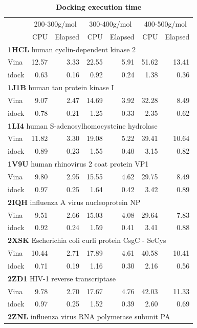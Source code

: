 \documentclass[10pt]{article}
\begin{document}
\begin{table}[!ht]
\caption{
\bf{Docking execution time}}
\begin{tabular}{lrrrrrr}
\hline
& \multicolumn{2}{c}{200-300g/mol} & \multicolumn{2}{c}{300-400g/mol} & \multicolumn{2}{c}{400-500g/mol}\\
& CPU & Elapsed & CPU & Elapsed & CPU & Elapsed\\
\hline
\multicolumn{7}{l}{\textbf{1HCL} human cyclin-dependent kinase 2}\\
Vina  & 12.57 &  3.33 & 22.55 &  5.91 & 51.62 & 13.41\\
idock &  0.63 &  0.16 &  0.92 &  0.24 &  1.38 &  0.36\\
\multicolumn{7}{l}{\textbf{1J1B} human tau protein kinase I}\\
Vina  &  9.07 &  2.47 & 14.69 &  3.92 & 32.28 &  8.49\\
idock &  0.78 &  0.21 &  1.25 &  0.33 &  2.35 &  0.62\\
\multicolumn{7}{l}{\textbf{1LI4} human S-adenosylhomocysteine hydrolase}\\
Vina  & 11.82 &  3.30 & 19.08 &  5.22 & 39.41 & 10.64\\
idock &  0.89 &  0.23 &  1.55 &  0.40 &  3.15 &  0.82\\
\multicolumn{7}{l}{\textbf{1V9U} human rhinovirus 2 coat protein VP1}\\
Vina  &  9.80 &  2.95 & 15.55 &  4.62 & 29.75 &  8.49\\
idock &  0.97 &  0.25 &  1.64 &  0.42 &  3.42 &  0.89\\
\multicolumn{7}{l}{\textbf{2IQH} influenza A virus nucleoprotein NP}\\
Vina  &  9.51 &  2.66 & 15.03 &  4.08 & 29.64 &  7.83\\
idock &  0.92 &  0.24 &  1.59 &  0.41 &  3.41 &  0.88\\
\multicolumn{7}{l}{\textbf{2XSK} Escherichia coli curli protein CsgC - SeCys}\\
Vina  & 10.44 &  2.71 & 17.89 &  4.61 & 40.58 & 10.41\\
idock &  0.71 &  0.19 &  1.16 &  0.30 &  2.16 &  0.56\\
\multicolumn{7}{l}{\textbf{2ZD1} HIV-1 reverse transcriptase}\\
Vina  &  9.78 &  2.70 & 17.67 &  4.76 & 42.03 & 11.33\\
idock &  0.97 &  0.25 &  1.52 &  0.39 &  2.60 &  0.69\\
\multicolumn{7}{l}{\textbf{2ZNL} influenza virus RNA polymerase subunit PA}\\

\end{tabular}
\end{table}
\end{document}
